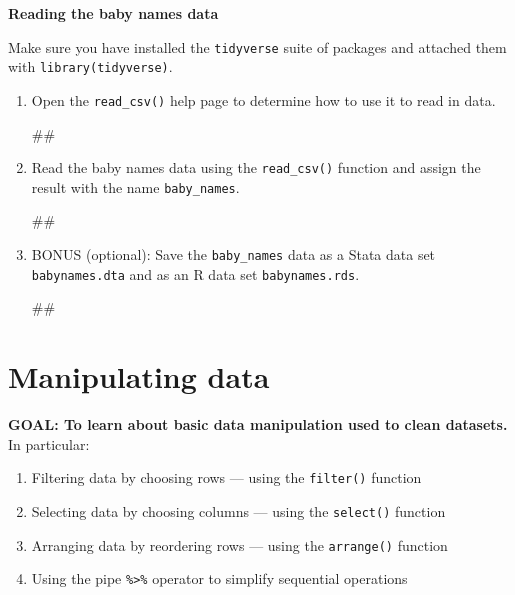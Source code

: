 \documentclass[]{book}
\newenvironment{Shaded}{\begin{snugshade}}{\end{snugshade}}
\newcommand{\NormalTok}[1]{#1}
\providecommand{\tightlist}{%
  \setlength{\itemsep}{0pt}\setlength{\parskip}{0pt}}
\begin{document}
\textbf{Reading the baby names data}

Make sure you have installed the \texttt{tidyverse} suite of packages
and attached them with \texttt{library(tidyverse)}.

\begin{enumerate}
\def\labelenumi{\arabic{enumi}.}
\item
  Open the \texttt{read\_csv()} help page to determine how to use it to
  read in data.

\begin{Shaded}
\begin{Highlighting}[]
\NormalTok{##}
\end{Highlighting}
\end{Shaded}
\item
  Read the baby names data using the \texttt{read\_csv()} function and
  assign the result with the name \texttt{baby\_names}.

\begin{Shaded}
\begin{Highlighting}[]
\NormalTok{##}
\end{Highlighting}
\end{Shaded}
\item
  BONUS (optional): Save the \texttt{baby\_names} data as a Stata data
  set \texttt{babynames.dta} and as an R data set
  \texttt{babynames.rds}.

\begin{Shaded}
\begin{Highlighting}[]
\NormalTok{##}
\end{Highlighting}
\end{Shaded}
\end{enumerate}

\section{Manipulating data}\label{manipulating-data}

\textbf{GOAL: To learn about basic data manipulation used to clean
datasets.} In particular:

\begin{enumerate}
\def\labelenumi{\arabic{enumi}.}
\tightlist
\item
  Filtering data by choosing rows --- using the \texttt{filter()}
  function
\item
  Selecting data by choosing columns --- using the \texttt{select()}
  function
\item
  Arranging data by reordering rows --- using the \texttt{arrange()}
  function
\item
  Using the pipe \texttt{\%\textgreater{}\%} operator to simplify
  sequential operations
\end{enumerate}
\end{document}
